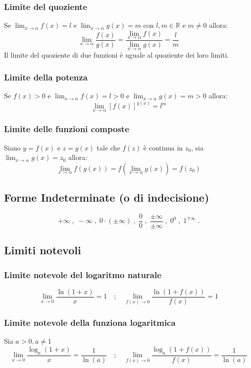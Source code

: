 \documentclass[a4paper,14pt]{extarticle}
\newcommand{\R}{\mathbb{R}}
\begin{document}
\subsubsection{Limite del quoziente}
Se $\lim_{x \to \alpha}f(x) = l$ e $\lim_{x \to \alpha}g(x) = m$ con $l,m \in\R$ e $m \neq 0$ allora: \[ \lim_{x \to \alpha} \frac{f(x)}{g(x)} = \frac{\lim_{x \to \alpha}f(x)}{\lim_{x \to \alpha}g(x)} = \frac{l}{m}\] Il limite del quoziente di due funzioni è uguale al quoziente dei loro limiti. 
\subsubsection{Limite della potenza}
Se $f(x) > 0$ e $\lim_{x \to \alpha}f(x) = l>0$ e $\lim_{x \to \alpha}g(x) = m>0$ allora: \[ \lim_{x \to \alpha}[f(x)]^{g(x)} = l^m \]
\subsubsection{Limite delle funzioni composte}
Siano $y=f(x)$ e $z=g(x)$ tale che $f(z)$ è continua in $z_0$, sia $\lim_{x \to \alpha}g(x) = z_0$ allora: \[ \lim_{x \to \alpha}f(g(x)) = f(\lim_{x \to \alpha}g(x)) = f(z_0)\]

\subsection{Forme Indeterminate (o di indecisione)}
\[ +\infty \;,\;-\infty\;,\;0\cdot (\pm \infty)\;,\;\frac{0}{0}\;,\;\frac{\pm \infty}{\pm \infty}\;,\;0^0\;,\;1^{\mp \infty}\;.\]

\subsection{Limiti notevoli}
\subsubsection{Limite notevole del logaritmo naturale}
\[ \lim_{x \to 0}\frac{\ln{(1 + x)}}{x} = 1 \quad;\quad \lim_{f(x) \to 0}\frac{\ln{(1 + f(x))}}{f(x)} = 1 \]

\subsubsection{Limite notevole della funziona logaritmica}
Sia $a > 0, a \neq 1$
\[ \lim_{x \to 0}\frac{\log_a{(1 + x)}}{x} = \frac{1}{\ln{(a)}} \quad;\quad \lim_{f(x) \to 0}\frac{\log_a{(1 + f(x))}}{f(x)} = \frac{1}{\ln{(a)}} \]
\end{document}
